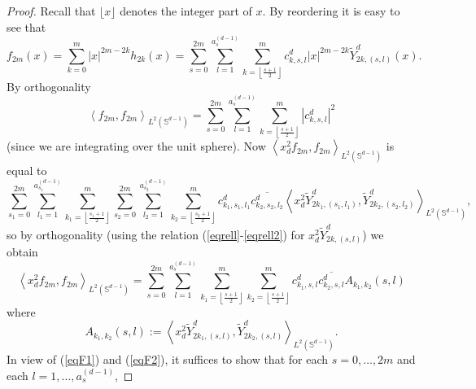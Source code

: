 \documentclass[10pt,a4paper]{amsart}
\begin{document}
\begin{proof}
Recall that $\lfloor x \rfloor$ denotes the integer part of $x$. By reordering it is easy
to see that 
\begin{equation*}
f_{2m} (x) 
=
\sum_{k=0}^{m} \left\vert x\right\vert
^{2m-2k} h_{2k} (x)
=
\sum_{s=0}^{2m}\sum_{l=1}^{a_{s}^{\left( d-1\right) }}\sum_{k=\left\lfloor
\frac{s+1}{2}\right\rfloor }^{m}c_{k,s,l}^d\left\vert x\right\vert ^{2m-2k}%
\widetilde{Y}_{2k,\left( s,l\right) }^{d}  (x).
\end{equation*}%
By orthogonality 
\begin{equation}
\left\langle f_{2m},f_{2m}\right\rangle _{L^2(\mathbb{S}^{d-1})}=\sum_{s=0}^{2m}%
\sum_{l=1}^{a_{s}^{\left( d-1\right) }}\sum_{k=\left\lfloor \frac{s+1}{2}\right\rfloor
}^{m}\left\vert c_{k,s,l}^d\right\vert ^{2}  \label{eqF1}
\end{equation}
(since we are integrating over the unit sphere).
Now $\left\langle x_{d}^{2}f_{2m},f_{2m}\right\rangle _{L^2(\mathbb{S}^{d-1})}$
is equal to 
\begin{equation*}
\sum_{s_{1}=0}^{2m}\sum_{l_{1}=1}^{a_{s_1}^{\left( d-1\right) }}\sum_{k_{1}= 
\left\lfloor \frac{s_1+1}{2}\right\rfloor }^{m}\sum_{s_{2}=0}^{2m}\sum_{l_{2}=1}^{a_{s_2}^{
\left( d-1\right) }}\sum_{k_{2}=\left\lfloor \frac{s_2+1}{2}\right\rfloor
}^{m}c_{k_{1},s_{1},l_{1}}^d\overline{c_{k_{2},s_{2},l_{2}}^d}\left\langle
x_{d}^{2}\widetilde{Y}^d_{2k_{1},\left( s_{1},l_{1}\right) },\widetilde{Y}^d
_{2k_{2},\left( s_{2},l_{2}\right) }\right\rangle _{L^2(\mathbb{S}^{d-1})},
\end{equation*}
so by orthogonality (using the relation (\ref{eqrell}-\ref{eqrell2}) for $
x_d^2 \widetilde{Y}^d_{2k,\left( s,l\right) }$)
we obtain    
\begin{equation}
\left\langle x_{d}^{2}f_{2m},f_{2m}\right\rangle _{L^2(\mathbb{S}^{d-1})}=\sum_{s=0}^{2m}\sum_{l=1}^{a_{s}^{\left( d-1\right) }}\sum_{k_{1}=
\left\lfloor \frac{s+1}{2}\right\rfloor }^{m}\sum_{k_{2}=\left\lfloor \frac{s+1}{2}\right\rfloor
}^{m}c^d_{k_{1},s,l}\overline{c^d_{k_{2},s,l}}A_{k_{1},k_{2}}\left( s,l\right)
\label{eqF2}
\end{equation}%
where 
\begin{equation*}
A_{k_{1},k_{2}}\left( s,l\right) :=\left\langle x_{d}^{2}\widetilde{Y}^d
_{2k_{1},\left( s,l\right) },\widetilde{Y}^d_{2k_{2},\left( s,l\right)
}\right\rangle_{L^2(\mathbb{S}^{d-1})}.
\end{equation*}
In view of (\ref{eqF1}) and (\ref{eqF2}), it suffices to show that for each $
s=0,\dots , 2m$ and each $l=1,\dots ,a_{s}^{\left( d-1\right) }$,

\end{proof}
\end{document}
